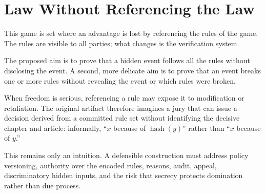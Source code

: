 \chapter{Law Without Referencing the Law}
\label{chap:law-without-referencing}


This game is set where an advantage is lost by referencing the rules of the
game. The rules are visible to all parties; what changes is the verification
system.

The proposed aim is to prove that a hidden event follows all the rules without
disclosing the event. A second, more delicate aim is to prove that an event
breaks one or more rules without revealing the event or which rules were
broken.

When freedom is serious, referencing a rule may expose it to modification or
retaliation. The original artifact therefore imagines a jury that can issue a
decision derived from a committed rule set without identifying the decisive
chapter and article: informally, ``\(x\) because of
\(\operatorname{hash}(y)\)'' rather than ``\(x\) because of \(y\).''

This remains only an intuition. A defensible construction must address policy
versioning, authority over the encoded rules, reasons, audit, appeal,
discriminatory hidden inputs, and the risk that secrecy protects domination
rather than due process.

